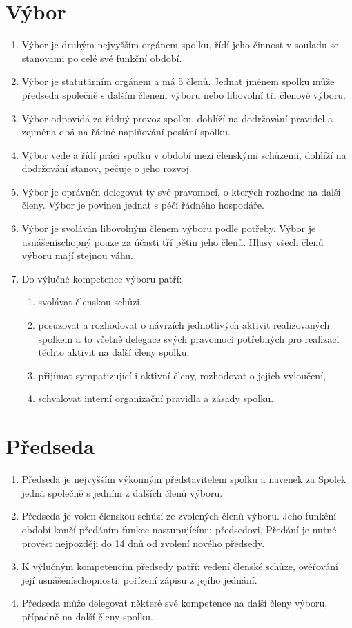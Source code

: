 \documentclass[11pt]{article}
\begin{document}
\section{Výbor}
\begin{enumerate}
    \item Výbor je druhým nejvyšším orgánem spolku, řídí jeho činnost v souladu 
    se stanovami po celé své funkční období. 
    \item Výbor je statutárním orgánem a má 5 členů. Jednat jménem spolku může 
    předseda společně s dalším členem výboru nebo libovolní tři členové výboru.
    \item Výbor odpovídá za řádný provoz spolku, dohlíží na dodržování pravidel 
    a zejména dbá na řádné naplňování poslání spolku.
    \item Výbor vede a řídí práci spolku v období mezi členskými schůzemi, 
    dohlíží na dodržování stanov, pečuje o jeho rozvoj.
    \item Výbor je oprávněn delegovat ty své pravomoci, o kterých rozhodne na 
    další členy. Výbor je povinen jednat s péčí řádného hospodáře. 
    \item Výbor je svoláván libovolným členem výboru podle potřeby. Výbor je 
    usnášeníschopný pouze za účasti tří pětin jeho členů. Hlasy všech členů 
    výboru mají stejnou váhu.
    \item Do výlučné kompetence výboru patří: 
    \begin{enumerate}
        \item svolávat členskou schůzi, 
        \item posuzovat a rozhodovat o návrzích jednotlivých aktivit 
        realizovaných spolkem a to včetně delegace svých pravomocí potřebných 
        pro realizaci těchto aktivit na další členy spolku,
        \item přijímat sympatizující i aktivní členy, rozhodovat o jejich 
        vyloučení,
        \item schvalovat interní organizační pravidla a zásady spolku.
    \end{enumerate}
\end{enumerate}

\section{Předseda}
\begin{enumerate}
    \item Předseda je nejvyšším výkonným představitelem spolku a navenek 
    za Spolek jedná společně s jedním z dalších členů výboru.  
    \item Předseda je volen členskou schůzí ze zvolených členů výboru. 
    Jeho funkční období končí předáním funkce nastupujícímu předsedovi. 
    Předání je nutné provést nejpozději do 14 dnů od zvolení nového předsedy. 
    \item K výlučným kompetencím předsedy patří: vedení členské schůze, 
    ověřování její usnášeníschopnosti, pořízení zápisu z jejího jednání.
    \item Předseda může delegovat některé své kompetence na další členy výboru, 
    případně na další členy spolku.
\end{enumerate}
\end{document}
